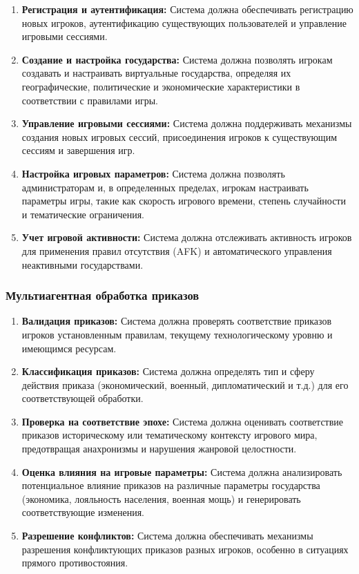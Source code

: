 \begin{enumerate}[label=FR\arabic*., resume]
    \item \textbf{Регистрация и аутентификация:} Система должна обеспечивать регистрацию новых игроков, аутентификацию существующих пользователей и управление игровыми сессиями.

    \item \textbf{Создание и настройка государства:} Система должна позволять игрокам создавать и настраивать виртуальные государства, определяя их географические, политические и экономические характеристики в соответствии с правилами игры.

    \item \textbf{Управление игровыми сессиями:} Система должна поддерживать механизмы создания новых игровых сессий, присоединения игроков к существующим сессиям и завершения игр.

    \item \textbf{Настройка игровых параметров:} Система должна позволять администраторам и, в определенных пределах, игрокам настраивать параметры игры, такие как скорость игрового времени, степень случайности и тематические ограничения.

    \item \textbf{Учет игровой активности:} Система должна отслеживать активность игроков для применения правил отсутствия (AFK) и автоматического управления неактивными государствами.
\end{enumerate}

\subsubsection{Мультиагентная обработка приказов}

\begin{enumerate}[label=FR\arabic*., resume]
    \item \textbf{Валидация приказов:} Система должна проверять соответствие приказов игроков установленным правилам, текущему технологическому уровню и имеющимся ресурсам.

    \item \textbf{Классификация приказов:} Система должна определять тип и сферу действия приказа (экономический, военный, дипломатический и т.д.) для его соответствующей обработки.

    \item \textbf{Проверка на соответствие эпохе:} Система должна оценивать соответствие приказов историческому или тематическому контексту игрового мира, предотвращая анахронизмы и нарушения жанровой целостности.

    \item \textbf{Оценка влияния на игровые параметры:} Система должна анализировать потенциальное влияние приказов на различные параметры государства (экономика, лояльность населения, военная мощь) и генерировать соответствующие изменения.

    \item \textbf{Разрешение конфликтов:} Система должна обеспечивать механизмы разрешения конфликтующих приказов разных игроков, особенно в ситуациях прямого противостояния.
\end{enumerate}

